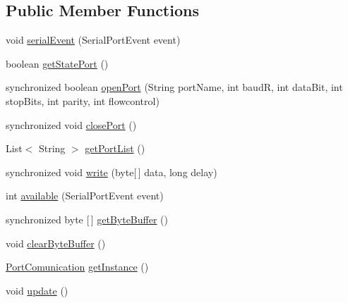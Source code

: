 \subsection*{Public Member Functions}
\begin{DoxyCompactItemize}
\item 
void \hyperlink{classcom_1_1eneri_1_1scorpio__metertool_1_1hardwarelayer_1_1_port_comunication_aae78c1d68860840140a3ac60ba606572}{serial\+Event} (Serial\+Port\+Event event)
\item 
boolean \hyperlink{classcom_1_1eneri_1_1scorpio__metertool_1_1hardwarelayer_1_1_port_comunication_ab119ef0afe0bf6d704b3090d2124ed78}{get\+State\+Port} ()
\item 
synchronized boolean \hyperlink{classcom_1_1eneri_1_1scorpio__metertool_1_1hardwarelayer_1_1_port_comunication_a00de6412a6414f68c2e0ecddb8588780}{open\+Port} (String port\+Name, int baudR, int data\+Bit, int stop\+Bits, int parity, int flowcontrol)
\item 
synchronized void \hyperlink{classcom_1_1eneri_1_1scorpio__metertool_1_1hardwarelayer_1_1_port_comunication_a50e533ddf3ece083c3d1ca4b557f16f7}{close\+Port} ()
\item 
List$<$ String $>$ \hyperlink{classcom_1_1eneri_1_1scorpio__metertool_1_1hardwarelayer_1_1_port_comunication_a22eacf19f2f075dfb2e3391d8f7b235c}{get\+Port\+List} ()
\item 
synchronized void \hyperlink{classcom_1_1eneri_1_1scorpio__metertool_1_1hardwarelayer_1_1_port_comunication_a61314c4a5a6fd401a5bc446659ac66fa}{write} (byte\mbox{[}$\,$\mbox{]} data, long delay)
\item 
int \hyperlink{classcom_1_1eneri_1_1scorpio__metertool_1_1hardwarelayer_1_1_port_comunication_a4b4e2b3d77595de9175c48ae5d34eacd}{available} (Serial\+Port\+Event event)
\item 
synchronized byte \mbox{[}$\,$\mbox{]} \hyperlink{classcom_1_1eneri_1_1scorpio__metertool_1_1hardwarelayer_1_1_port_comunication_ac4b39af4892fcc9273dbd296faa8ca88}{get\+Byte\+Buffer} ()
\item 
void \hyperlink{classcom_1_1eneri_1_1scorpio__metertool_1_1hardwarelayer_1_1_port_comunication_ad58b5d68c4828c64b853263e4fdaa898}{clear\+Byte\+Buffer} ()
\item 
\hyperlink{classcom_1_1eneri_1_1scorpio__metertool_1_1hardwarelayer_1_1_port_comunication}{Port\+Comunication} \hyperlink{classcom_1_1eneri_1_1scorpio__metertool_1_1hardwarelayer_1_1_port_comunication_ab777a22494865eaeea35be2b2c880663}{get\+Instance} ()
\item 
void \hyperlink{classcom_1_1eneri_1_1scorpio__metertool_1_1hardwarelayer_1_1_port_comunication_a0b4950b26174d60f826a3ba260a7c191}{update} ()
\end{DoxyCompactItemize}
